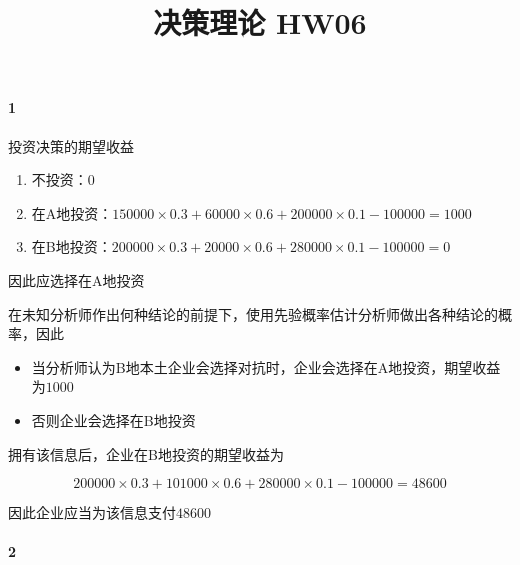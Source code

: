 \documentclass{../notes}
\title{决策理论 HW06}
\begin{document}
    \maketitle
    \paragraph*{1}

    \begin{subquestions}
        \item 投资决策的期望收益

        \begin{enumerate}[label=\arabic*.]
            \item 不投资：$0$
            \item 在A地投资：$150000\times 0.3 + 60000 \times 0.6 + 200000\times 0.1 - 100000 = 1000$
            \item 在B地投资：$200000\times 0.3 + 20000 \times 0.6 + 280000 \times 0.1 - 100000 = 0$
        \end{enumerate}

        因此应选择在A地投资

        \item 在未知分析师作出何种结论的前提下，使用先验概率估计分析师做出各种结论的概率，因此

        \begin{itemize}
            \item 当分析师认为B地本土企业会选择对抗时，企业会选择在A地投资，期望收益为$1000$
            \item 否则企业会选择在B地投资
        \end{itemize}

        拥有该信息后，企业在B地投资的期望收益为

        \begin{equation}
            200000\times 0.3 + 101000 \times 0.6 + 280000 \times 0.1 - 100000 = 48600
        \end{equation}

        因此企业应当为该信息支付$48600$
    \end{subquestions}

    \paragraph*{2}
\end{document}
